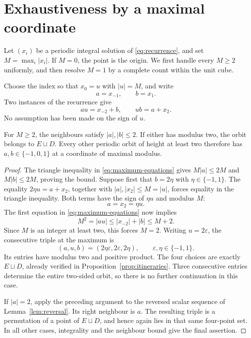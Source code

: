 \section{Exhaustiveness by a maximal coordinate}\label{sec:exhaustiveness}

Let $(x_i)$ be a periodic integral solution of
\eqref{eq:recurrence}, and set $M=\max_i|x_i|$. If $M=0$,
the point is the origin. We first handle every $M\geq2$ uniformly,
and then resolve $M=1$ by a complete count within the unit cube.

Choose the index so that $x_0=u$ with $|u|=M$, and write
\begin{equation}\label{eq:neighbours}
 a=x_{-1},\qquad b=x_1.
\end{equation}
Two instances of the recurrence give
\begin{equation}\label{eq:maximum-equations}
 au=x_{-2}+b,\qquad ub=a+x_2.
\end{equation}
No assumption has been made on the sign of $u$.

\begin{lemma}\label{lem:maximum}
For $M\geq2$, the neighbours satisfy $|a|,|b|\leq2$.
If either has modulus two, the orbit belongs to $E\sqcup D$.
Every other periodic orbit of height at least two therefore has
$a,b\in\{-1,0,1\}$ at a coordinate of maximal modulus.
\end{lemma}
\begin{proof}
The triangle inequality in \eqref{eq:maximum-equations} gives
$M|a|\leq2M$ and $M|b|\leq2M$, proving the bound.
Suppose first that $b=2\eta$ with $\eta\in\{-1,1\}$.
The equality $2\eta u=a+x_2$, together with
$|a|,|x_2|\leq M=|u|$, forces equality in the triangle
inequality. Both terms have the sign of $\eta u$ and modulus $M$:
\begin{equation}\label{eq:equal-neighbour}
 a=x_2=\eta u.
\end{equation}
The first equation in \eqref{eq:maximum-equations} now implies
\begin{equation}\label{eq:Mtwo}
 M^2=|au|\leq |x_{-2}|+|b|\leq M+2.
\end{equation}
Since $M$ is an integer at least two, this forces $M=2$.
Writing $u=2\varepsilon$, the consecutive triple at the maximum is
\begin{equation}\label{eq:special-signed}
 (a,u,b)=(2\eta\varepsilon,2\varepsilon,2\eta),
 \qquad\varepsilon,\eta\in\{-1,1\}.
\end{equation}
Its entries have modulus two and positive product. The four choices
are exactly $E\sqcup D$, already verified in
Proposition~\ref{prop:itineraries}. Three consecutive entries
determine the entire two-sided orbit, so there is no further
continuation in this case.

If $|a|=2$, apply the preceding argument to the reversed scalar
sequence of Lemma~\ref{lem:reversal}. Its right neighbour is $a$.
The resulting triple is a permutation of a point of $E\sqcup D$,
and hence again lies in that same four-point set. In all other cases,
integrality and the neighbour bound give the final assertion.
\end{proof}

